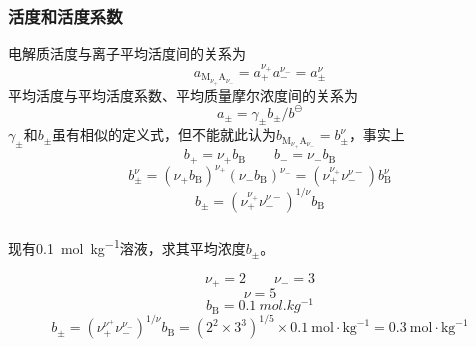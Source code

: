 \documentclass[dvipsnames, svgnames, x11names]{beamer}
\begin{document}
	
	\begin{frame}
		\frametitle{活度和活度系数}
	
		电解质活度与离子平均活度间的关系为
		\[
			a_{\mathrm{M}_{\nu_{+}} \mathrm{A}_{\nu_-}}=a_{+}^{\nu_{+}} a_{-}^{\nu_-}=a_{\pm}^{\nu}
		\]
		平均活度与平均活度系数、平均质量摩尔浓度间的关系为
		\[
			a_{\pm}=\gamma_{\pm} b_{\pm} / b^{\ominus}
		\]
		$\gamma_{\pm}$和$b_{\pm}$虽有相似的定义式，但不能就此认为$b_{\mathrm{M}_{\nu_{+}} \mathrm{A}_{\nu_-}}=b_{\pm}^\nu$，事实上
		\[
			b_+=\nu_+b_\mathrm{B} \qquad b_-=\nu_-b_\mathrm{B}
		\]
		\[
			b_{\pm}^{\nu}=(\nu_{+} b_{\mathrm{B}})^{\nu_{+}}(\nu_{-} b_{\mathrm{B}})^{\nu_-}=(\nu_{+}^{\nu_{+}} \nu_{-}^{\nu-}) b_{\mathrm{B}}^{\nu}
		\]
		\[
			b_{\pm}=(\nu_{+}^{\nu_{+}} \nu_{-}^{\nu-})^{1 / \nu} b_{\mathrm{B}}
		\]
	
	\end{frame}
	
	
	\begin{frame}[t]
		\frametitle{}
	
		\begin{example}
			现有\SI{0.1}{mol.kg^{-1}}溶液，求其平均浓度$b_{\pm}$。
		\end{example}
		\pause
		\[
			\nu_{+}=2 \qquad \nu_{-}=3        
		\]
		\[
			\nu=5
		\]
		\[
			b_\mathrm{B}=\SI{0.1}{mol.kg^{-1}}
		\]
		\[
			b_{\pm}=(\nu_+^{\nu^+} \nu_-^{\nu_-})^{1 / \nu} b_{\mathrm{B}}=(2^{2} \times 3^{3})^{1 / 5} \times 0.1 \mathrm{~mol} \cdot \mathrm{kg}^{-1}=0.3 \mathrm{~mol} \cdot \mathrm{kg}^{-1}
		\]
	
	\end{frame}
	
\end{document}
